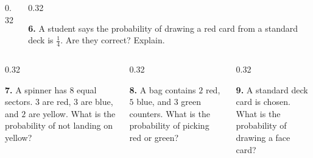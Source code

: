 \documentclass[aspectratio=169,12pt]{beamer}
\newcommand{\MMProblem}[2]{\begin{MMProblemCard}\raggedright\small\textbf{#1.} #2\par\end{MMProblemCard}}
\begin{document}
\begin{frame}[t]
\begin{columns}[T,onlytextwidth]
\begin{column}{0.32\textwidth}
{\vspace{0.4em}
\coindietree}\end{column}
\begin{column}{0.32\textwidth}\MMProblem{6}{A student says the probability of drawing a red card from a standard deck is \mbox{$\frac{1}{4}$}. Are they correct? Explain.}\end{column}
\end{columns}
\vspace{0.45em}
\begin{columns}[T,onlytextwidth]
\begin{column}{0.32\textwidth}\MMProblem{7}{A spinner has \mbox{$8$} equal sectors. \mbox{$3$} are red, \mbox{$3$} are blue, and \mbox{$2$} are yellow. What is the probability of not landing on yellow?}\end{column}
\begin{column}{0.32\textwidth}\MMProblem{8}{A bag contains \mbox{$2$} red, \mbox{$5$} blue, and \mbox{$3$} green counters. What is the probability of picking red or green?}\end{column}
\begin{column}{0.32\textwidth}\MMProblem{9}{A standard deck card is chosen. What is the probability of drawing a face card?}\end{column}
\end{columns}
\end{frame}
\end{document}
